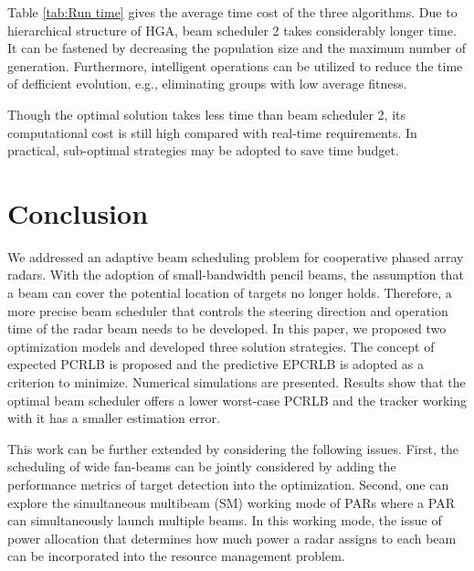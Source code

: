 \documentclass[12pt,journal,draftclsnofoot,onecolumn]{IEEEtran}
\begin{document}
Table \ref{tab:Run time} gives the average time cost of the three algorithms. Due to hierarchical structure of HGA, beam scheduler 2 takes considerably longer time. It can be fastened by decreasing the population size and the maximum number of generation. Furthermore, intelligent operations can be utilized to reduce the time of defficient evolution, e.g., eliminating groups with low average fitness. 

Though the optimal solution takes less time than beam scheduler 2, its computational cost is still high compared with real-time requirements. In practical, sub-optimal strategies may be adopted to save time budget.

\section{Conclusion}
We addressed an adaptive beam scheduling problem for cooperative phased array radars. With the adoption of small-bandwidth pencil beams, the assumption that a beam can cover the potential location of targets no longer holds. Therefore, a more precise beam scheduler that controls the steering direction and operation time of the radar beam needs to be  developed. In this paper, we proposed two optimization models and  developed three solution strategies. The concept of expected PCRLB is proposed and the predictive EPCRLB is adopted as a criterion to minimize. Numerical simulations are presented. Results show that the optimal beam scheduler offers a lower worst-case PCRLB and the tracker working with it has a smaller estimation error.

This work can be further extended by considering the following issues. First, the scheduling of wide fan-beams can be jointly considered by adding the performance metrics of target detection into the optimization. Second, one can explore the simultaneous multibeam (SM) working mode of PARs where a PAR can simultaneously launch multiple beams. In this working mode, the issue of power allocation that determines how much power a radar assigns to each beam can be incorporated into the resource management problem.



\end{document}
